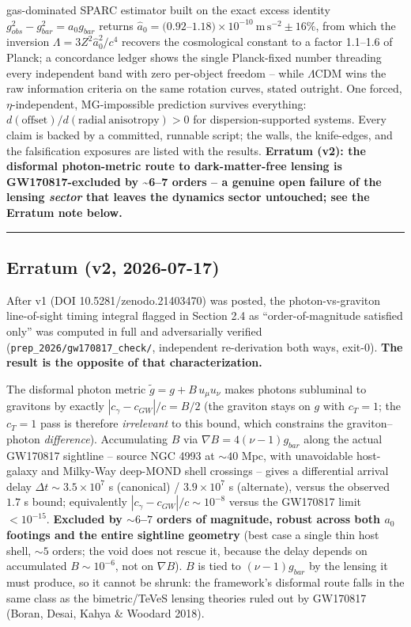 \documentclass[
]{article}
\begin{document}
gas-dominated SPARC estimator built on the exact excess identity
\(g_{obs}^2-g_{bar}^2 = a_0 g_{bar}\) returns
\(\hat a_0 = (0.92\)--\(1.18)\times 10^{-10}\ \mathrm{m\,s^{-2}} \pm 16\%\),
from which the inversion \(\Lambda = 3Z^2 \hat a_0^2/c^4\) recovers the
cosmological constant to a factor 1.1--1.6 of Planck; a concordance
ledger shows the single Planck-fixed number threading every independent
band with zero per-object freedom -- while \(\Lambda\)CDM wins the raw
information criteria on the same rotation curves, stated outright. One
forced, \(\eta\)-independent, MG-impossible prediction survives
everything: \(d(\mathrm{offset})/d(\mathrm{radial\ anisotropy}) > 0\)
for dispersion-supported systems. Every claim is backed by a committed,
runnable script; the walls, the knife-edges, and the falsification
exposures are listed with the results. \textbf{Erratum (v2): the
disformal photon-metric route to dark-matter-free lensing is
GW170817-excluded by \textasciitilde6--7 orders -- a genuine open
failure of the lensing \emph{sector} that leaves the dynamics sector
untouched; see the Erratum note below.}

\begin{center}\rule{0.5\linewidth}{0.5pt}\end{center}

\subsection{Erratum (v2, 2026-07-17)}\label{erratum-v2-2026-07-17}

After v1 (DOI 10.5281/zenodo.21403470) was posted, the
photon-vs-graviton line-of-sight timing integral flagged in Section 2.4
as ``order-of-magnitude satisfied only'' was computed in full and
adversarially verified (\texttt{prep\_2026/gw170817\_check/},
independent re-derivation both ways, exit-0). \textbf{The result is the
opposite of that characterization.}

The disformal photon metric \(\tilde g = g + B\,u_\mu u_\nu\) makes
photons subluminal to gravitons by exactly
\(|c_\gamma - c_{GW}|/c = B/2\) (the graviton stays on \(g\) with
\(c_T=1\); the \(c_T=1\) pass is therefore \emph{irrelevant} to this
bound, which constrains the graviton--photon \emph{difference}).
Accumulating \(B\) via \(\nabla B = 4(\nu-1)g_{bar}\) along the actual
GW170817 sightline -- source NGC 4993 at \(\sim 40\) Mpc, with
unavoidable host-galaxy and Milky-Way deep-MOND shell crossings -- gives
a differential arrival delay \(\Delta t \sim 3.5\times 10^{7}\) s
(canonical) / \(3.9\times 10^{7}\) s (alternate), versus the observed
\(1.7\) s bound; equivalently \(|c_\gamma - c_{GW}|/c \sim 10^{-8}\)
versus the GW170817 limit \(< 10^{-15}\). \textbf{Excluded by
\(\sim 6\)--\(7\) orders of magnitude, robust across both \(a_0\)
footings and the entire sightline geometry} (best case a single thin
host shell, \(\sim 5\) orders; the void does not rescue it, because the
delay depends on accumulated \(B\sim 10^{-6}\), not on \(\nabla B\)).
\(B\) is tied to \((\nu-1)g_{bar}\) by the lensing it must produce, so
it cannot be shrunk: the framework's disformal route falls in the same
class as the bimetric/TeVeS lensing theories ruled out by GW170817
(Boran, Desai, Kahya \& Woodard 2018).
\end{document}
